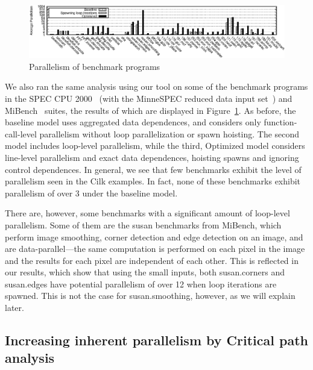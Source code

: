 \begin{figure}
 \centering
\includegraphics[width=5in]{benches}
\caption{Parallelism of benchmark programs}
\label{benchmarks}
\end{figure}

We also ran the same analysis using our tool on some of the benchmark programs in the SPEC CPU 2000~\cite{henning00spec} (with the MinneSPEC reduced data input set~\cite{KleinOsowski02minnespec}) and MiBench~\cite{guthaus01mibench} suites, the results of which are displayed in Figure~\ref{benchmarks}.
As before, the baseline model uses aggregated data dependences, and considers only function-call-level parallelism without loop parallelization or spawn hoisting.
The second model includes loop-level parallelism, while the third, \textsf{Optimized} model considers line-level parallelism and exact data dependences, hoisting spawns and ignoring control dependences.
In general, we see that few benchmarks exhibit the level of parallelism seen in the Cilk examples.
In fact, none of these benchmarks exhibit parallelism of over 3 under the baseline model.

There are, however, some benchmarks with a significant amount of loop-level parallelism.
Some of them are the \textsf{susan} benchmarks from MiBench, which perform image smoothing, corner detection and edge detection on an image, and are data-parallel---the same computation is performed on each pixel in the image and the results for each pixel are independent of each other.
This is reflected in our results, which show that using the small inputs, both \textsf{susan.corners} and \textsf{susan.edges} have potential parallelism of over 12 when loop iterations are spawned.
This is not the case for \textsf{susan.smoothing}, however, as we will explain later.

\subsection{Increasing inherent parallelism by Critical path analysis} \label{sresults:increasing}

